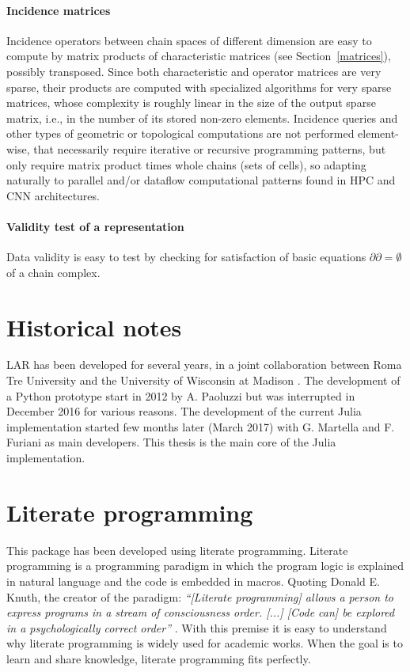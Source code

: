 \paragraph{Incidence matrices}
Incidence operators between chain spaces of different dimension are easy to compute by matrix products of characteristic matrices (see Section~\ref{matrices}), possibly transposed.
Since both characteristic and operator matrices are very sparse, their products are computed with  specialized algorithms for very sparse matrices, whose complexity is roughly linear in the size of the output sparse matrix, i.e., in the number of its stored non-zero elements.
Incidence queries and other types of geometric or topological computations are not performed element-wise, that necessarily require iterative or recursive programming patterns, but only require matrix product times whole chains (sets of cells), so adapting naturally to parallel and/or dataflow computational patterns found in HPC and CNN architectures.

\paragraph{Validity test of a representation}
Data validity is easy to test by checking for satisfaction of basic equations $\partial\partial=\emptyset$ of a chain complex.



\section{Historical notes}
\label{sec:history}
LAR has been developed for several years, in a joint collaboration 
between Roma Tre University and the University 
of Wisconsin at Madison \cite{ieee-tase}. The development of a Python 
prototype start in 2012 by A. Paoluzzi but was interrupted 
in December 2016 for various reasons. The development of the current
Julia implementation started few months later (March 2017) with
G. Martella and F. Furiani as main developers. This thesis is
the main core of the Julia implementation.


\section{Literate programming}
This package has been developed using literate programming.
Literate programming is a programming paradigm in which the program
logic is explained in natural language and the code is embedded in macros.
Quoting Donald E. Knuth, the creator of the paradigm: 
\textit{``[Literate programming] allows a person to express programs in a stream of
consciousness order. [...] [Code can] be explored
in a psychologically correct order''} \cite{knuth}. 
With this premise it is easy to understand why literate programming 
is widely used for academic works.
When the goal is to learn and share knowledge, literate programming fits perfectly.


